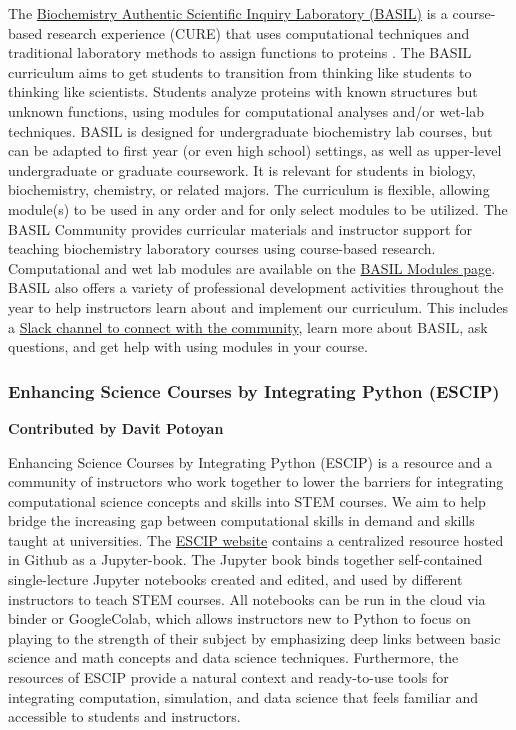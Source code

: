 \documentclass[9pt,review]{livecoms}
\begin{document}
The \href{(https://www.basilbiochem.org/home)}{Biochemistry Authentic Scientific Inquiry Laboratory (BASIL)} is a course-based research experience (CURE) that uses computational techniques and traditional laboratory methods to assign functions to proteins \cite{Roberts2019}. 
The BASIL curriculum aims to get students to transition from thinking like students to thinking like scientists. 
Students analyze proteins with known structures but unknown functions, using modules for computational analyses and/or wet-lab techniques. 
BASIL is designed for undergraduate biochemistry lab courses, but can be adapted to first year (or even high school) settings, as well as upper-level undergraduate or graduate coursework. It is relevant for students in biology, biochemistry, chemistry, or related majors. The curriculum is flexible, allowing module(s) to be used in any order and for only select modules to be utilized.
The BASIL Community provides curricular materials and instructor support for teaching biochemistry laboratory courses using course-based research. Computational and wet lab modules are available on the \href{https://www.basilbiochem.org/basil-modules}{BASIL Modules page}. 
BASIL also offers a variety of professional development activities throughout the year to help instructors learn about and implement our curriculum. This includes a \href{https://join.slack.com/t/onlinebasildiscussion/shared_invite/zt-1skdrd7br-x9MWjHCcNjmV0gkNftNMaw}{Slack channel to connect with the community}, learn more about BASIL, ask questions, and get help with using modules in your course.

\subsubsection{Enhancing Science Courses by Integrating Python (ESCIP)}

\textbf{Contributed by Davit Potoyan}

Enhancing Science Courses by Integrating Python (ESCIP) is a resource and a community of instructors who work together to lower the barriers for integrating computational science concepts and skills into STEM courses. 
We aim to help bridge the increasing gap between computational skills in demand and skills taught at universities. 
The \href{https://escip.github.io/}{ESCIP website} contains a centralized resource hosted in Github as a Jupyter-book. 
The Jupyter book binds together self-contained single-lecture Jupyter notebooks created and edited, and used by different instructors to teach STEM courses. 
All notebooks can be run in the cloud via binder or GoogleColab, which allows instructors new to Python to focus on playing to the strength of their subject by emphasizing deep links between basic science and math concepts and data science techniques. 
Furthermore, the resources of ESCIP provide a natural context and ready-to-use tools for integrating computation, simulation, and data science that feels familiar and accessible to students and instructors.
\end{document}
